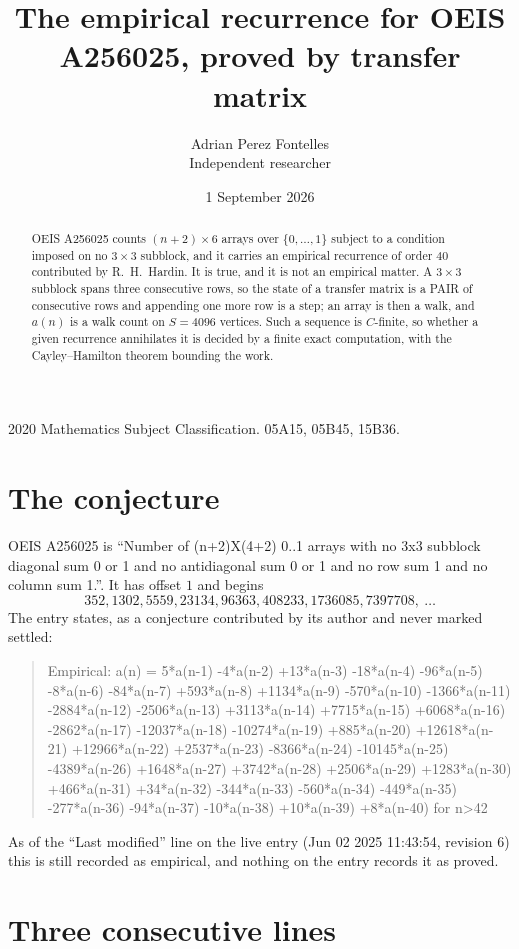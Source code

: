\documentclass[11pt,a4paper]{article}
\title{The empirical recurrence for OEIS A256025, proved by transfer matrix}
\author{Adrian Perez Fontelles\\ \small Independent researcher}
\date{1 September 2026}
\theoremstyle{plain}
\theoremstyle{definition}
\begin{document}
\maketitle

\begin{abstract}
OEIS A256025 counts $(n+2)\times6$ arrays over $\{0,\dots,1\}$ subject to a condition imposed on
no $3\times3$ subblock, and it carries an empirical recurrence of order $40$
contributed by R.~H.~Hardin. It is true, and it is not an empirical matter. A $3\times3$
subblock spans three consecutive rows, so the state of a transfer matrix is a PAIR of
consecutive rows and appending one more row is a step; an array is then a walk, and
$a(n)$ is a walk count on $S=4096$ vertices. Such a sequence is $C$-finite, so whether a given
recurrence annihilates it is decided by a finite exact computation, with the Cayley--Hamilton
theorem bounding the work.
\end{abstract}

\noindent\small 2020 Mathematics Subject Classification. 05A15, 05B45, 15B36.\normalsize

\section{The conjecture}

OEIS A256025 is ``Number of (n+2)X(4+2) 0..1 arrays with no 3x3 subblock diagonal sum 0 or 1 and no antidiagonal sum 0 or 1 and no row sum 1 and no column sum 1.''. It has offset $1$ and begins
\[
352, 1302, 5559, 23134, 96363, 408233, 1736085, 7397708,\ \dots
\]
The entry states, as a conjecture contributed by its author and never marked settled:
\begin{quote}
Empirical: a(n) = 5*a(n-1) -4*a(n-2) +13*a(n-3) -18*a(n-4) -96*a(n-5) -8*a(n-6) -84*a(n-7) +593*a(n-8) +1134*a(n-9) -570*a(n-10) -1366*a(n-11) -2884*a(n-12) -2506*a(n-13) +3113*a(n-14) +7715*a(n-15) +6068*a(n-16) -2862*a(n-17) -12037*a(n-18) -10274*a(n-19) +885*a(n-20) +12618*a(n-21) +12966*a(n-22) +2537*a(n-23) -8366*a(n-24) -10145*a(n-25) -4389*a(n-26) +1648*a(n-27) +3742*a(n-28) +2506*a(n-29) +1283*a(n-30) +466*a(n-31) +34*a(n-32) -344*a(n-33) -560*a(n-34) -449*a(n-35) -277*a(n-36) -94*a(n-37) -10*a(n-38) +10*a(n-39) +8*a(n-40) for n>42
\end{quote}
As of the ``Last modified'' line on the live entry (Jun 02 2025 11:43:54, revision 6) this is still
recorded as empirical, and nothing on the entry records it as proved.

\section{Three consecutive lines}
\end{document}
